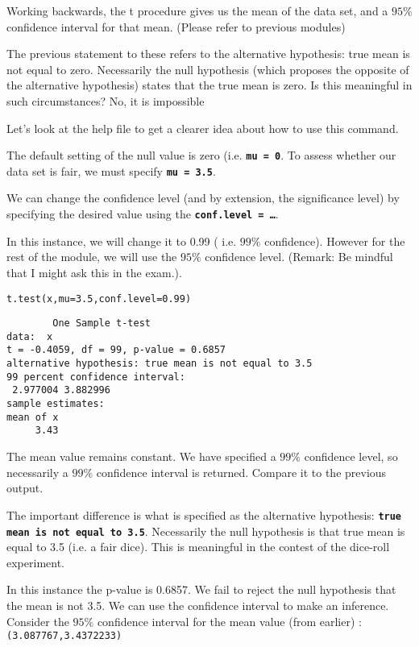 Working backwards, the t procedure gives us the mean of the data set, and a $95\%$ confidence interval for that mean.  (Please refer to previous modules)

The previous statement to these refers to the alternative hypothesis: true mean is not equal to zero. Necessarily the null hypothesis (which proposes the opposite of the alternative hypothesis) states that the true mean is zero.
Is this meaningful in such circumstances? No, it is impossible

Let’s look at the help file to get a clearer idea about how to use this command.

The default setting of the null value is zero (i.e. \textbf{\texttt{mu = 0}}. To assess whether our data set is fair, we must specify \textbf{\texttt{mu = 3.5}}.

We can change the confidence level (and by extension,  the significance level)  by specifying the desired value using the \textbf{\texttt{conf.level = …}}.

In this instance, we will change it to 0.99 ( i.e. $99\%$ confidence). However for the rest of the module, we will use the $95\%$ confidence level. (Remark: Be mindful that I might ask this in the exam.).

\begin{framed}
\begin{verbatim}
t.test(x,mu=3.5,conf.level=0.99)
\end{verbatim}
\end{framed}

\begin{verbatim}
        One Sample t-test
data:  x
t = -0.4059, df = 99, p-value = 0.6857
alternative hypothesis: true mean is not equal to 3.5
99 percent confidence interval:
 2.977004 3.882996
sample estimates:
mean of x
     3.43
\end{verbatim}
The mean value remains constant. We have specified a $99\%$ confidence level, so necessarily a $99\%$ confidence interval is returned. Compare it to the previous output.

The important difference is what is specified as the alternative hypothesis: \textbf{\texttt{true mean is not equal to 3.5}}. Necessarily the null hypothesis is that true mean is equal to 3.5 (i.e. a fair dice). This is meaningful in the contest of the dice-roll experiment.

In this instance the p-value is 0.6857. We fail to reject the null hypothesis that the mean is not 3.5.
We can use the confidence interval to make an inference. Consider the $95\%$ confidence interval for the mean value (from earlier) : \texttt{(3.087767,3.4372233)}

